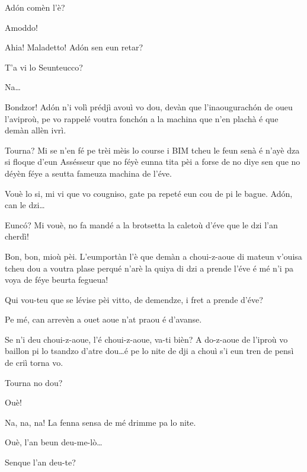 \begin{drama}
\Diegospeaks{} Ad\'on comèn l'è?

\Attilaspeaks {} Amoddo!

\Diegospeaks{} Ahia! Maladetto! Ad\'on sen eun retar?

\Seunteuccospeaks T'a vi lo Seunteucco?

\Attilaspeaks Na\ldots


\Seunteuccospeaks Bondzor! Ad\'on n’i volì prédjì avouì vo dou, devàn que l’inaougurach\'on de oueu l’aviproù, pe vo rappelé voutra fonch\'on a la machina que n'en plachà é que demàn allèn ivrì.

\Diegospeaks Tourna? Mi se n'en fé pe trèi mèis lo course i BIM tcheu le feun senà é n'ayè dza si floque d'eun Assésseur que no féyè eunna tita pèi a forse de no diye sen que no déyèn féye a seutta fameuza machina de l'éve.

\Seunteuccospeaks Vouè lo si, mi vi que vo cougniso, gate pa repeté eun cou de pi le bague. Ad\'on, can le dzi\ldots

\Attilaspeaks{} Eunc\'o? Mi vouè, no fa mandé a la brotsetta la caletoù d’éve que le dzi l’an cherdì!

\Seunteuccospeaks Bon, bon, mioù pèi. L’eumportàn l’è que demàn a choui-z-aoue di mateun v'ouisa tcheu dou a voutra plase perqué n’arè la quiya di dzi a prende l’éve é mé n’i pa voya de féye beurta fegueua!

\Diegospeaks Qui vou-teu que se lévise pèi vitto, de demendze, i fret a prende d’éve?

\Attilaspeaks Pe mé, can arrevèn a ouet aoue n’at praou é d'avanse.

\Seunteuccospeaks Se n’i deu choui-z-aoue, l’é choui-z-aoue, va-ti bièn? A do-z-aoue de l’iproù vo baillon pi lo tsandzo d'atre dou\ldots é pe lo nite de dji a chouì s'i eun tren de pensì de criì torna vo.

\Diegospeaks Tourna no dou?

\Seunteuccospeaks Ouè!

\Attilaspeaks Na, na, na! La fenna sensa de mé drimme pa lo nite.

\Diegospeaks {} Ouè, l’an beun deu-me-lò\ldots

\Diegospeaks {} Senque l'an deu-te?


\end{drama}
